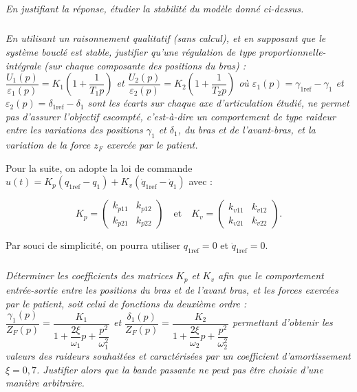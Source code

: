 \begin{multicols}{2}
\subparagraph{}\textit{En justifiant la réponse, étudier la stabilité du modèle donné ci-dessus.}
\ifprof
\begin{corrige}
\end{corrige}
\else
\fi


\subparagraph{}\textit{En utilisant un raisonnement qualitatif (sans calcul), et en supposant que le système bouclé est stable, justifier qu’une régulation de type proportionnelle-intégrale (sur chaque composante des positions du bras) :
$\dfrac{U_1(p)}{\varepsilon_1(p)}=K_1\left(1+\dfrac{1}{T_1 p}\right)$
et
$\dfrac{U_2(p)}{\varepsilon_2(p)}=K_2\left(1+\dfrac{1}{T_2 p}\right)$
où $\varepsilon_1(p)=\gamma_{1\text{ref}}-\gamma_1$
et $\varepsilon_2(p)=\delta_{1\text{ref}}-\delta_1$ sont les écarts sur chaque axe d’articulation étudié, ne permet pas
d’assurer l’objectif escompté, c’est-à-dire un comportement de type raideur entre les variations des positions 
$\gamma_1$ et $\delta_1$, du bras et de l’avant-bras, et la variation de la force $z_F$ exercée par le patient.
}
\ifprof
\begin{corrige}
\end{corrige}
\else
\fi

Pour la suite, on adopte la loi de commande $u(t)=K_p \left(q_{1\text{ref}}-q_1\right)+K_v \left(\dot{q}_{1\text{ref}}-\dot{q}_1\right)$ avec :

$$
K_p = \begin{pmatrix} 
k_{p11} & k_{p12} \\
k_{p21} & k_{p22}
\end{pmatrix}
\quad
\text{et}
\quad 
K_v = \begin{pmatrix} 
k_{v11} & k_{v12} \\
k_{v21} & k_{v22}
\end{pmatrix}.
$$

Par souci de simplicité, on pourra utiliser $q_{1\text{ref}}=0$ et $\dot{q}_{1\text{ref}}=0$.



\subparagraph{}\textit{Déterminer les coefficients des matrices $K_p$ et $K_v$ afin que le comportement entrée-sortie entre les positions du bras et de l’avant bras, et les forces exercées par le patient, soit celui de fonctions du deuxième ordre :
$\dfrac{\gamma_1(p)}{Z_F(p)}=\dfrac{K_1}{1+\dfrac{2\xi}{\omega_1}p+\dfrac{p^2}{\omega_1^2}}$ 
et 
$\dfrac{\delta_1(p)}{Z_F(p)}=\dfrac{K_2}{1+\dfrac{2\xi}{\omega_2}p+\dfrac{p^2}{\omega_2^2}}$
permettant d’obtenir les valeurs des raideurs souhaitées et caractérisées par un coefficient d’amortissement
$\xi = 0,7$. Justifier alors que la bande passante ne peut pas être choisie d’une manière arbitraire.
}
\ifprof
\begin{corrige}
\end{corrige}
\else
\fi



\end{multicols}
